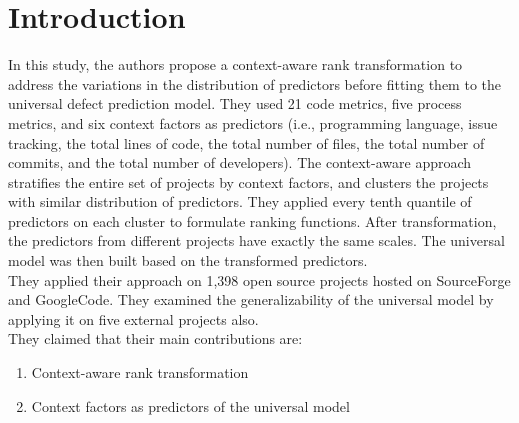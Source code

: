\section{Introduction}
In this study, the authors propose a context-aware rank transformation to address the variations in the distribution of predictors before fitting them to the universal defect prediction model. They used 21 code metrics, five process metrics, and six context factors as predictors (i.e., programming language, issue tracking, the total lines of code, the total number of files, the total number of commits, and the total number of developers). The context-aware approach stratifies the entire set of projects by context factors, and clusters the
projects with similar distribution of predictors. They applied every tenth quantile of predictors on each cluster to formulate ranking functions. After transformation, the predictors from different projects have exactly the same scales. The universal model was then built based on the transformed predictors.\\
They applied their approach on 1,398 open source projects hosted on SourceForge and GoogleCode. They examined the generalizability of the universal model
by applying it on five external projects also.\\
They claimed that their main contributions are:

\begin{enumerate}
\bf\item Context-aware rank transformation

\bf\item Context factors as predictors of the universal model
\end{enumerate}



